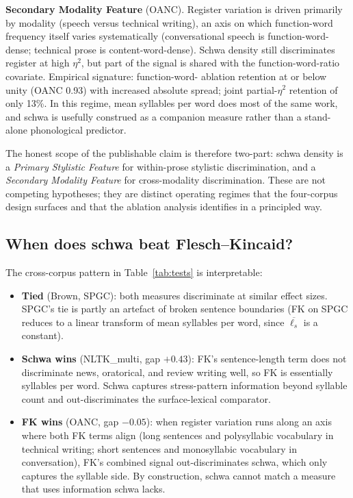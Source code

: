 \documentclass[11pt,a4paper]{article}
\begin{document}
\textbf{Secondary Modality Feature} (OANC). Register variation is
driven primarily by modality (speech versus technical writing), an
axis on which function-word frequency itself varies systematically
(conversational speech is function-word-dense; technical prose is
content-word-dense). Schwa density still discriminates register at
high \(\eta^2\), but part of the signal is shared with the
function-word-ratio covariate. Empirical signature: function-word-
ablation retention at or below unity (OANC 0.93) with increased
absolute spread; joint partial-\(\eta^2\) retention of only 13\%. In
this regime, mean syllables per word does most of the same work, and
schwa is usefully construed as a companion measure rather than a
stand-alone phonological predictor.

The honest scope of the publishable claim is therefore two-part:
schwa density is a \emph{Primary Stylistic Feature} for within-prose
stylistic discrimination, and a \emph{Secondary Modality Feature} for
cross-modality discrimination. These are not competing hypotheses; they
are distinct operating regimes that the four-corpus design surfaces
and that the ablation analysis identifies in a principled way.

\subsection{When does schwa beat Flesch--Kincaid?}

The cross-corpus pattern in Table~\ref{tab:tests} is interpretable:

\begin{itemize}
\item \textbf{Tied} (Brown, SPGC): both measures discriminate at
similar effect sizes. SPGC's tie is partly an artefact of broken
sentence boundaries (FK on SPGC reduces to a linear transform of mean
syllables per word, since \(\overline{\ell_s}\) is a constant).

\item \textbf{Schwa wins} (NLTK\_multi, gap \(+0.43\)): FK's
sentence-length term does not discriminate news, oratorical, and
review writing well, so FK is essentially syllables per word. Schwa
captures stress-pattern information beyond syllable count and
out-discriminates the surface-lexical comparator.

\item \textbf{FK wins} (OANC, gap \(-0.05\)): when register variation
runs along an axis where both FK terms align (long sentences and
polysyllabic vocabulary in technical writing; short sentences and
monosyllabic vocabulary in conversation), FK's combined signal
out-discriminates schwa, which only captures the syllable side. By
construction, schwa cannot match a measure that uses information
schwa lacks.
\end{itemize}
\end{document}
